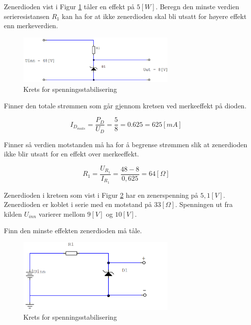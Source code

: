 \begin{question}[name=Oppgave, topic=zenerdioder]
Zenerdioden vist i Figur \ref{fig:zenKrets3} tåler en effekt på $5 [W]$. Beregn den minste verdien serieresistansen $R_1$ kan ha for at ikke zenerdioden skal bli utsatt for høyere effekt enn merkeverdien.
\begin{figure}[H]
	\centering
	\includegraphics[width=0.7\textwidth]{diode/figurer/zenKrets3.png}
	\caption{Krets for spenningsstabilisering}
	\label{fig:zenKrets3}
\end{figure}
\end{question}

\vspace{0.5cm} %

\begin{solution}[name=Løsningsforslag oppgave]
Finner den totale strømmen som går gjennom kretsen ved merkeeffekt på dioden.

\[I_{D_{maks}} = \frac{P_D}{U_D} = \frac{5}{8} = 0.625 = 625 [mA]\]


Finner så verdien motstanden må ha for å begrense strømmen slik at zenerdioden ikke blir utsatt for en effekt over merkeeffekt.


\[R_1 = \frac{U_{R_1}}{I_{R_1}}= \frac{48-8}{0,625}= 64 [\Omega]\]
\end{solution}



\begin{question}[name=Oppgave, topic=zenerdioder]
Zenerdioden i kretsen som vist i Figur \ref{fig:zenKrets4} har en zenerspenning på $5,1 [V]$. Zenerdioden er koblet i serie med en motstand på $33 [\Omega]$. Spenningen ut fra kilden $U_{inn}$ varierer mellom $9[V]$ og $10 [V]$.

Finn den minste effekten zenerdioden må tåle.
\begin{figure}[H]
	\centering
	\includegraphics[width=0.7\textwidth]{diode/figurer/zenKrets4.png}
	\caption{Krets for spenningsstabilisering}
	\label{fig:zenKrets4}
\end{figure}

\end{question}

